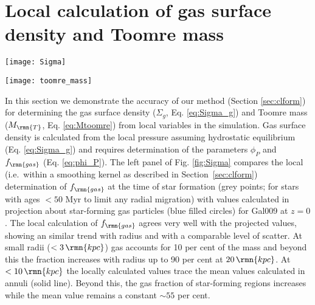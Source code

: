 \documentclass[fleqn,usenatbib]{mnras}
\newcommand\kpc{\,\rmn{kpc}}
\newcommand{\Mtoomre}{M_\rmn{T}}
\begin{document}
\section{Local calculation of gas surface density and Toomre mass} \label{app:Sigma}

\begin{figure*}
  \texttt{[image: Sigma]}
  \caption{ Gas fraction, $\phi_P$ and gas surface density calculated locally (as indicated by the legends) for the simulated galaxy Gal009 at $z=0$ for stellar particles younger than 50 Myr (grey points). Solid lines show the results for linearly-spaced annuli of the projected galaxy and large filled circles show the values calculated for the 2000 baryonic particles projected closest around 150 randomly chosen star formation-eligible gas particles (i.e.~those within 0.5 dex of the temperature floor, see Section \ref{sec:eagle}). }
  \label{fig:Sigma}
\end{figure*}

\begin{figure*}
  \texttt{[image: toomre\_mass]}
  \caption{ Toomre mass, mass collapse fraction and molecular cloud mass for Gal009. The solid line shows the Toomre mass calculated in linearly-spaced annuli around the centre of the galaxy.}
  \label{fig:MToomre}
\end{figure*}

In this section we demonstrate the accuracy of our method (Section \ref{sec:clform}) for determining the gas surface density ($\Sigma_g$, Eq. \ref{eq:Sigma_g}) and Toomre mass ($\Mtoomre$, Eq. \ref{eq:Mtoomre}) from local variables in the simulation. 
Gas surface density is calculated from the local pressure assuming hydrostatic equilibrium (Eq. \ref{eq:Sigma_g}) and requires determination of the parameters $\phi_P$ and $f_\rmn{gas}$ (Eq. \ref{eq:phi_P}). 
The left panel of Fig. \ref{fig:Sigma} compares the local (i.e.~within a smoothing kernel as described in Section~\ref{sec:clform}) determination of $f_\rmn{gas}$ at the time of star formation (grey points; for stars with ages $<50$ Myr to limit any radial migration) with values calculated in projection about star-forming gas particles (blue filled circles) for Gal009 at $z=0$.
The local calculation of $f_\rmn{gas}$ agrees very well with the projected values, showing an similar trend with radius and with a comparable level of scatter. At small radii ($<3\kpc$) gas accounts for 10 per cent of the mass and beyond this the fraction increases with radius up to 90 per cent at $20\kpc$. At $<10\kpc$ the locally calculated values trace the mean values calculated in annuli (solid line). Beyond this, the gas fraction of star-forming regions increases while the mean value remains a constant $\sim55$ per cent.
\end{document}
